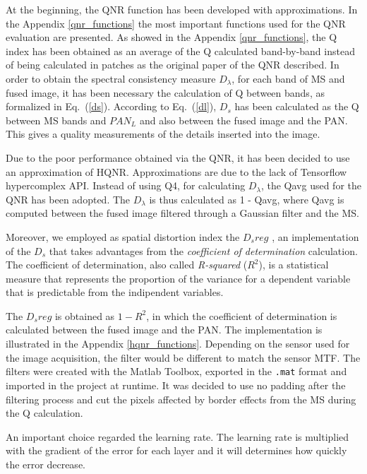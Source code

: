 \documentclass[12pt]{report}
\begin{document}
At the beginning, the QNR function has been developed with approximations. 
In the Appendix \ref{qnr_functions}  the most important functions used for the QNR evaluation are presented.
As showed in the Appendix \ref{qnr_functions}, the Q index has been obtained as an average of the Q calculated band-by-band
instead of being calculated in patches as the original paper of the QNR described.
In order to obtain the spectral consistency measure $D_\lambda$, for each band of MS and fused image, 
it has been necessary the calculation of Q between bands, as formalized in Eq.~(\ref{ds}).
According to Eq.~(\ref{dl}), $D_s$ has been calculated as the Q between MS bands and $PAN_L$ and also between the fused image and the PAN.
This gives a quality measurements of the details inserted into the image. 

Due to the poor performance obtained via the QNR, it has been decided to use an approximation of HQNR. 
Approximations are due to the lack of Tensorflow hypercomplex API.
Instead of using Q4, for calculating $D_\lambda$, the Qavg used for the QNR has been adopted.
The $D_\lambda$ is thus calculated as 1 - Qavg, where Qavg is computed between the fused image filtered through a Gaussian filter and the MS.

Moreover, we employed as spatial distortion index the $D_sreg$ \cite{dsreg}, an implementation of the $D_s$ that takes advantages from the \textit{coefficient of determination} calculation. 
The coefficient of determination, also called \textit{R-squared} ($R^2$), is a statistical measure that represents the proportion of the variance for a dependent variable that is predictable from the indipendent variables.

The $D_sreg$ is obtained as $1 - R^2$, in which the coefficient of determination is calculated between the fused image and the PAN. 
The implementation is illustrated in the Appendix \ref{hqnr_functions}.
Depending on the sensor used for the image acquisition, the filter would be different to match the sensor MTF.
The filters were created with the Matlab Toolbox, exported in the \texttt{.mat} format and imported in the project at runtime.
It was decided to use no padding after the filtering process and cut the pixels affected by border effects from the MS during the Q calculation.  

An important choice regarded the learning rate. The learning rate is multiplied with the gradient of the error for each layer
and it will determines how quickly the error decrease. 
\end{document}
